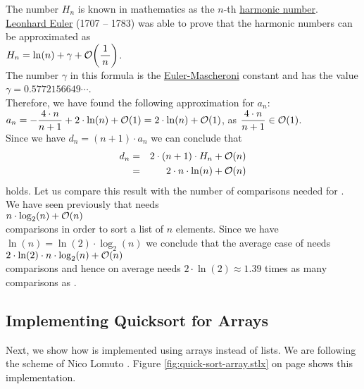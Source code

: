 The number $H_n$ is known in mathematics as the $n$-th 
\href{http://en.wikipedia.org/wiki/Harmonic_number}{harmonic number}. 
\href{http://en.wikipedia.org/wiki/Leonhard_Euler}{Leonhard Euler} (1707 -- 1783) 
was able to prove that the harmonic numbers can be approximated as
\\[0.2cm]
\hspace*{1.3cm}
$\displaystyle H_n = \ln(n) + \gamma + \mathcal{O}\biggl(\frac{1}{\,n\,}\biggr)$. 
\\[0.2cm] 
The number $\gamma$ in this formula is the
\href{http://en.wikipedia.org/wiki/Euler-Mascheroni_constant}{Euler-Mascheroni} 
constant and has the value
\\[0.2cm]
\hspace*{1.3cm}
$\gamma = 0.5772156649 \cdots$.
\\[0.2cm]
Therefore, we have found the following approximation for $a_n$:
\\[0.2cm]
\hspace*{1.3cm}
$\displaystyle a_n = - \frac{4 \cdot n}{n+1}  + 2 \cdot \ln(n) + \mathcal{O}(1) =  2 \cdot \ln(n) + \mathcal{O}(1)$,
\quad as \quad $\displaystyle \frac{4 \cdot n}{n+1} \in \mathcal{O}(1)$.
\\[0.2cm]
Since we have $d_n = (n+1) \cdot a_{n}$ we can conclude that
\begin{eqnarray*}  
 d_n & = &  2 \cdot(n+1) \cdot H_n + \mathcal{O}(n) \\
     & = & 2 \cdot n \cdot \ln(n) + \mathcal{O}(n)
\end{eqnarray*}
holds.  Let us compare this result with the number of comparisons needed for .
We have seen previously that  needs
\\[0.2cm]
\hspace*{1.3cm} $n \cdot \log_2(n) + \mathcal{O}(n)$ \\[0.2cm]
comparisons in order to sort a list of $n$ elements.  Since we have $\ln(n) = \ln(2) \cdot \log_2(n)$
we conclude that the average case of  needs
 \\[0.2cm]
\hspace*{1.3cm} $2 \cdot \ln(2) \cdot n \cdot \log_2(n) + \mathcal{O}(n)$ \\[0.2cm]
comparisons and hence on average  needs  $2 \cdot \ln(2) \approx 1.39$ times as many comparisons as
.  


\subsection{Implementing Quicksort for Arrays}
Next, we show how   is implemented using arrays instead of lists.  We are following the scheme
of Nico Lomuto \cite{cormen:09} .
Figure \ref{fig:quick-sort-array.stlx} on page \pageref{fig:quick-sort-array.stlx} shows this implementation. 

